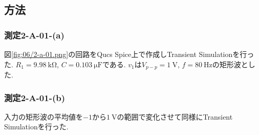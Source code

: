 \subsection{方法}
\subsubsection{測定2-A-01-(a)}
図\ref{fig:06/2-a-01.png}の回路をQucs Spice上で作成しTransient Simulationを行った.
$R_1=9.98\ \si{\kilo\ohm}$, $C=0.103\ \si{\micro\farad}$である.
$v_1$は$V_{p-p}=1\ \si{\volt}$, $f=80\ \si{\hertz}$の矩形波とした.
\subsubsection{測定2-A-01-(b)}
入力の矩形波の平均値を$-1$から$1\ \si{\volt}$の範囲で変化させて同様にTransient Simulationを行った.